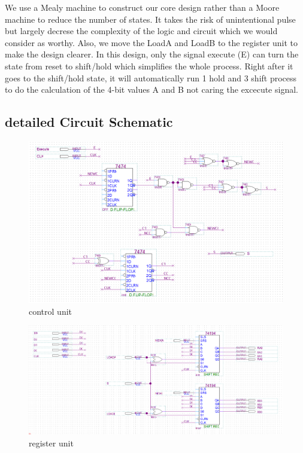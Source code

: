 \documentclass[12pt]{article}
\begin{document}
We use a Mealy machine to construct our core design rather than a Moore machine to reduce the number of states. It takes the risk of unintentional pulse but largely decrese the complexity of the logic and circuit which we would consider as worthy. Also, we move the LoadA and LoadB to the register unit to make the design clearer. In this design, only the signal execute (E) can turn the state from reset to shift/hold which simplifies the whole process. Right after it goes to the shift/hold state, it will automatically run 1 hold and 3 shift process to do the calculation of the 4-bit values A and B not caring the excecute signal.


\subsection{detailed Circuit Schematic}
\begin{figure}[H]
    \centering
    \includegraphics[width=18cm]{control_unit.png}
    \caption{control unit}
\end{figure}
\begin{figure}[H]
    \centering
    \includegraphics[width=18cm]{register_unit.png}
    \caption{register unit}
\end{figure}
\end{document}

